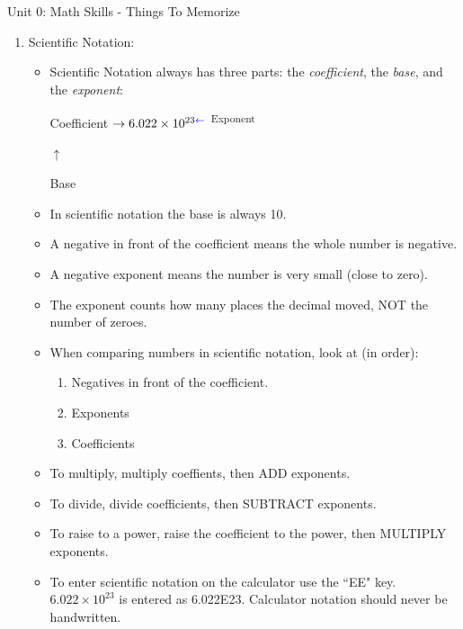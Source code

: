 \documentclass[letterpaper, 12pt]{article}
\newcommand{\assnum}{Unit 0: Math Skills}
\newcommand{\assname}{Things To Memorize}
\begin{document}
\fancyfoot[r]{\assnum}	


\begin{center} \assnum{} - \assname{}
\end{center}





\begin{enumerate}
	\item Scientific Notation:
		\begin{itemize}
			\item Scientific Notation always has three parts: the \textit{coefficient}, the \textit{base}, and the \textit{exponent}:
			\begin{center}
				\color{blue} Coefficient $\rightarrow \color{black} 6.022 \times 10^{23 \color{blue}\leftarrow}$ \textsuperscript{Exponent} \color{black}
				
				\hspace{.7in} \color{blue}$\uparrow$
				
				\hspace{.7in} Base \color{black}
			\end{center}
		\item In scientific notation the base is always 10.
		\item A negative in front of the coefficient means the whole number is negative.
		\item A negative exponent means the number is very small (close to zero).
		\item The exponent counts how many places the decimal moved, NOT the number of zeroes.	
		\item When comparing numbers in scientific notation, look at (in order): 
		\begin{enumerate}
			\item Negatives in front of the coefficient.
			\item Exponents
			\item Coefficients
		\end{enumerate}
	
	\item To multiply, multiply coeffients, then ADD exponents.
	\item To divide, divide coefficients, then SUBTRACT exponents.
	\item To raise to a power, raise the coefficient to the power, then MULTIPLY exponents.
	\item To enter scientific notation on the calculator use the ``EE" key. $6.022 \times 10^{23}$ is entered as 6.022\scriptsize E\normalsize23.  Calculator notation should never be handwritten. 
	\end{itemize}
	

\end{enumerate}
\end{document}
